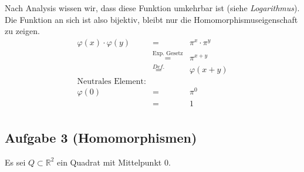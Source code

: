 \documentclass[11pt,a4paper,ngerman]{article}
\newcommand{\R}{\mathbb{R}}
\begin{document}
Nach Analysis wissen wir, dass diese Funktion umkehrbar ist (siehe \emph{Logarithmus}). Die Funktion an sich ist also bijektiv, bleibt nur die Homomorphismuseigenschaft zu zeigen.
$$
\begin{array}{rcl}
\varphi (x) \cdot \varphi (y) &=& \pi^{x} \cdot \pi^{y}\\
	&\stackrel{\text{Exp. Gesetz}}{=}& \pi^{x + y}\\
	&\stackrel{Def.}{=}& \varphi(x+y)\\
\text{Neutrales Element:}&&\\
\varphi (0) &=& \pi^0\\
	&=& 1\\
\end{array}
$$

\subsection*{Aufgabe 3 \mdseries (Homomorphismen)}
Es sei $Q \subset \R^2$ ein Quadrat mit Mittelpunkt 0.\\
\end{document}

